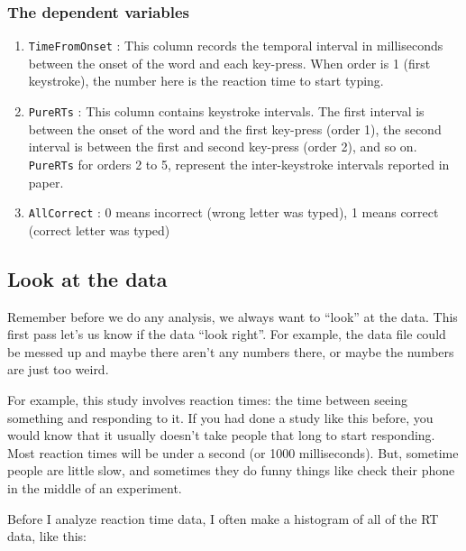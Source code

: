\documentclass[
]{book}
\newenvironment{Shaded}{\begin{snugshade}}{\end{snugshade}}
\newcommand{\FunctionTok}[1]{\textcolor[rgb]{0.13,0.29,0.53}{\textbf{#1}}}
\newcommand{\NormalTok}[1]{#1}
\newcommand{\SpecialCharTok}[1]{\textcolor[rgb]{0.81,0.36,0.00}{\textbf{#1}}}
\providecommand{\tightlist}{%
  \setlength{\itemsep}{0pt}\setlength{\parskip}{0pt}}
\begin{document}
\hypertarget{the-dependent-variables}{%
\subsubsection{The dependent variables}\label{the-dependent-variables}}

\begin{enumerate}
\def\labelenumi{\arabic{enumi}.}
\tightlist
\item
  \texttt{TimeFromOnset} : This column records the temporal interval in milliseconds between the onset of the word and each key-press. When order is 1 (first keystroke), the number here is the reaction time to start typing.
\item
  \texttt{PureRTs} : This column contains keystroke intervals. The first interval is between the onset of the word and the first key-press (order 1), the second interval is between the first and second key-press (order 2), and so on. \texttt{PureRTs} for orders 2 to 5, represent the inter-keystroke intervals reported in paper.
\item
  \texttt{AllCorrect} : 0 means incorrect (wrong letter was typed), 1 means correct (correct letter was typed)
\end{enumerate}

\hypertarget{look-at-the-data-3}{%
\subsection{Look at the data}\label{look-at-the-data-3}}

Remember before we do any analysis, we always want to ``look'' at the data. This first pass let's us know if the data ``look right''. For example, the data file could be messed up and maybe there aren't any numbers there, or maybe the numbers are just too weird.

For example, this study involves reaction times: the time between seeing something and responding to it. If you had done a study like this before, you would know that it usually doesn't take people that long to start responding. Most reaction times will be under a second (or 1000 milliseconds). But, sometime people are little slow, and sometimes they do funny things like check their phone in the middle of an experiment.

Before I analyze reaction time data, I often make a histogram of all of the RT data, like this:

\begin{Shaded}
\end{Shaded}
\end{document}
